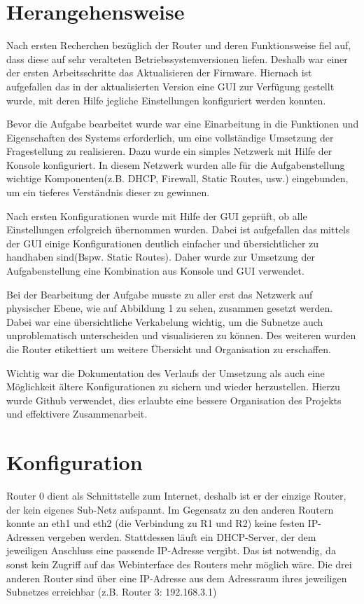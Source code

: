 \documentclass[10pt,a4paper]{article}
\begin{document}
	\section{Herangehensweise}
	Nach ersten Recherchen bezüglich der Router und deren Funktionsweise fiel auf, dass diese auf sehr veralteten Betriebssystemversionen liefen. Deshalb war einer der ersten Arbeitsschritte das Aktualisieren der Firmware. Hiernach ist aufgefallen das in der aktualisierten Version eine GUI zur Verfügung gestellt wurde, mit deren Hilfe jegliche Einstellungen konfiguriert werden konnten. 
\par
	Bevor die Aufgabe bearbeitet wurde war eine Einarbeitung in die Funktionen und Eigenschaften des Systems erforderlich, um eine vollständige Umsetzung der Fragestellung zu realisieren. Dazu wurde ein simples Netzwerk mit Hilfe der Konsole konfiguriert. In diesem Netzwerk wurden alle für die Aufgabenstellung wichtige Komponenten(z.B. DHCP, Firewall, Static Routes, usw.) eingebunden, um ein tieferes Verständnis dieser zu gewinnen.
\par
	Nach ersten Konfigurationen wurde mit Hilfe der GUI geprüft, ob alle Einstellungen erfolgreich übernommen wurden. Dabei ist aufgefallen das mittels der GUI einige Konfigurationen deutlich einfacher und übersichtlicher zu handhaben sind(Bspw. Static Routes). Daher wurde zur Umsetzung der Aufgabenstellung eine Kombination aus Konsole und GUI verwendet.
\par
	Bei der Bearbeitung der Aufgabe musste zu aller erst das Netzwerk auf physischer Ebene, wie auf Abbildung 1 zu sehen, zusammen gesetzt werden. Dabei war eine übersichtliche Verkabelung wichtig, um die Subnetze auch unproblematisch unterscheiden und visualisieren zu können. Des weiteren wurden die Router etikettiert um weitere Übersicht und Organisation zu erschaffen.
\par
	Wichtig war die Dokumentation des Verlaufs der Umsetzung als auch eine Möglichkeit ältere Konfigurationen zu sichern und wieder herzustellen. Hierzu wurde Github verwendet, dies erlaubte eine bessere Organisation des Projekts und effektivere Zusammenarbeit.
	
	
	\section{Konfiguration}
	Router 0 dient als Schnittstelle zum Internet, deshalb ist er der einzige Router, der kein eigenes Sub-Netz aufspannt. Im Gegensatz zu den anderen Routern konnte an eth1 und eth2 (die Verbindung zu R1 und R2) keine festen IP-Adressen vergeben werden. Stattdessen läuft ein DHCP-Server, der dem jeweiligen Anschluss eine passende IP-Adresse vergibt. Das ist notwendig, da sonst kein Zugriff auf das Webinterface des Routers mehr möglich wäre. Die drei anderen Router sind über eine IP-Adresse aus dem Adressraum ihres jeweiligen Subnetzes erreichbar (z.B. Router 3: 192.168.3.1) \par
	
\end{document}
